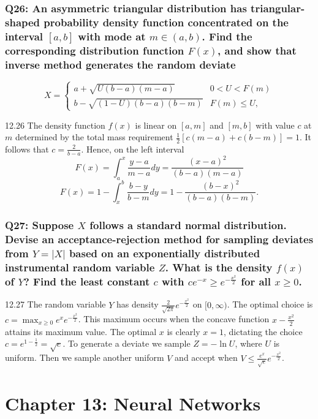 \documentclass[8pt]{article}
\begin{document}
\subsubsection*{Q26: An asymmetric triangular distribution has triangular-shaped probability density function concentrated on the interval \([a, b]\) with mode at \(m \in (a, b)\). Find the corresponding distribution function \(F(x)\), and show that inverse method generates the random deviate}
\[
X = 
\begin{cases} 
a + \sqrt{U(b - a)(m - a)} & 0 < U < F(m) \\
b - \sqrt{(1 - U)(b - a)(b - m)} & F(m) \leq U,
\end{cases}
\]

12.26 The density function \(f(x)\) is linear on \([a, m]\) and \([m, b]\) with value \(c\) at \(m\) determined by the total mass requirement \(\frac{1}{2}[c(m - a) + c(b - m)] = 1\). It follows that \(c = \frac{2}{b-a}\). Hence, on the left interval
\[
F(x) = \int_a^x \frac{y - a}{m - a} dy = \frac{(x - a)^2}{(b - a)(m - a)}
\]
\[
F(x) = 1 - \int_x^b \frac{b - y}{b - m} dy = 1 - \frac{(b - x)^2}{(b - a)(b - m)}.
\]


\subsubsection*{Q27: Suppose \(X\) follows a standard normal distribution. Devise an acceptance-rejection method for sampling deviates from \(Y = |X|\) based on an exponentially distributed instrumental random variable \(Z\). What is the density \(f(x)\) of \(Y\)? Find the least constant \(c\) with \(ce^{-x} \geq e^{-\frac{x^2}{2}}\) for all \(x \geq 0\).}

12.27 The random variable \(Y\) has density \(\frac{2}{\sqrt{2\pi}} e^{-\frac{x^2}{2}}\) on \([0, \infty)\). The optimal choice is \(c = \max_{x \geq 0} e^x e^{-\frac{x^2}{2}}\). This maximum occurs when the concave function \(x - \frac{x^2}{2}\) attains its maximum value. The optimal \(x\) is clearly \(x = 1\), dictating the choice \(c = e^{1 - \frac{1}{2}} = \sqrt{e}\). To generate a deviate we sample \(Z = -\ln U\), where \(U\) is uniform. Then we sample another uniform \(V\) and accept when \(V \leq \frac{e^x}{\sqrt{e}} e^{-\frac{x^2}{2}}\).

\newpage
\section*{Chapter 13: Neural Networks}
\end{document}
